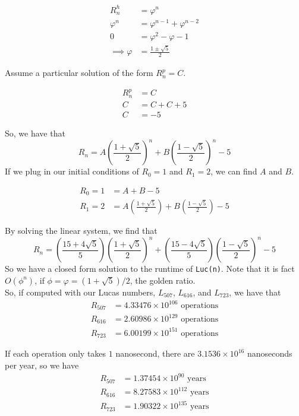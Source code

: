 \documentclass[12pt]{article}
\begin{document}
\begin{enumerate}
\begin{enumerate}
    \begin{align*}
        R_n^h &= \varphi^n\\
        \varphi^n &= \varphi^{n-1} + \varphi^{n-2}\\
        0 &= \varphi^2 -\varphi -1\\
        \implies \varphi &= \frac{1\pm \sqrt{5}}{2}
    \end{align*}
    
    Assume a particular solution of the form $R_n^p = C$.
    
    \begin{align*}
        R_n^p &= C\\
        C &= C + C + 5\\
        C &= -5
    \end{align*}
    
    So, we have that
    \[
        R_n = A\left(\frac{1+\sqrt{5}}{2}\right)^n + B\left(\frac{1-\sqrt{5}}{2}\right)^n - 5
    \]
    If we plug in our initial conditions of $R_0 = 1$ and $R_1 = 2$, we can find $A$ and $B$.

    \begin{align*}
        R_0 = 1 &= A + B - 5\\
        R_1 = 2 &= A\left(\frac{1+\sqrt{5}}{2}\right) + B\left(\frac{1-\sqrt{5}}{2}\right) - 5
    \end{align*}
    
    By solving the linear system, we find that
    \[
        R_n = \left(\frac{15+4\sqrt{5}}{5}\right)\left(\frac{1+\sqrt{5}}{2}\right)^n + \left(\frac{15-4\sqrt{5}}{5}\right)\left(\frac{1-\sqrt{5}}{2}\right)^n - 5
    \]
    So we have a closed form solution to the runtime of {\tt Luc(n)}. Note that it is fact $O(\phi^n)$, if $\phi = \varphi = (1+\sqrt{5})/2$, the golden ratio.\\
    
    So, if computed with our Lucas numbers, $L_{507}$, $L_{616}$, and $L_{723}$, we have that 
    \begin{align*}
        R_{507} &= 4.33476\times 10^{106} \text{ operations}\\
        R_{616} &= 2.60986\times 10^{129} \text{ operations}\\
        R_{723} &= 6.00199\times 10^{151} \text{ operations}
    \end{align*}
    
    If each operation only takes $1$ nanosecond, there are $3.1536\times 10^{16}$ nanoseconds per year, so we have
    \begin{align*}
        R_{507} &= 1.37454\times 10^{90} \text{ years}\\
        R_{616} &= 8.27583\times 10^{112} \text{ years}\\
        R_{723} &= 1.90322\times 10^{135} \text{ years}
    \end{align*}
	

\end{enumerate}
\end{enumerate}
\end{document}
